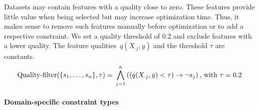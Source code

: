 \begin{enumerate}[label=(I\arabic*), wide]
	Datasets may contain features with a quality close to zero.
	These features provide little value when being selected but may increase optimization time.
	Thus, it makes sense to remove such features manually before optimization or to add a respective constraint.
	We set a quality threshold of 0.2 and exclude features with a lower quality.
	The feature qualities~$q(X_{\cdot{}j},y)$ and the threshold $\tau$ are constants.
	\begin{equation}
		\text{Quality-filter}(\{s_1, \dots, s_n\}, \tau) =\\
		\bigwedge_{j=1}^{n} \left( \left( q(X_{\cdot{}j},y) < \tau \right) \rightarrow \lnot s_j \right) \text{, with } \tau = 0.2
		\label{eq:ms:constraint:quality-filter}
	\end{equation}
\end{enumerate}

\paragraph{Domain-specific constraint types}

